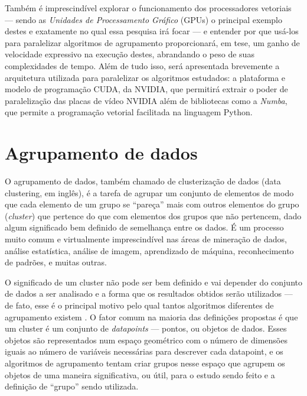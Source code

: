 \documentclass[12pt, %
openright, 
oneside, %
a4paper,    %
brazil]{facom-ufu-abntex2}
\begin{document}
Também é imprescindível explorar o funcionamento dos processadores vetoriais --- sendo as \textit{Unidades de Processamento Gráfico} (GPUs) o principal exemplo destes e exatamente no qual essa pesquisa irá focar --- e entender por que usá-los para paralelizar algoritmos de agrupamento proporcionará, em tese, um ganho de velocidade expressivo na execução destes, abrandando o peso de suas complexidades de tempo. Além de tudo isso, será apresentada brevemente a arquitetura utilizada para paralelizar os algoritmos estudados: a plataforma e modelo de programação CUDA, da NVIDIA, que permitirá extrair o poder de paralelização das placas de vídeo NVIDIA além de bibliotecas como a \textit{Numba}, que permite a programação vetorial facilitada na linguagem Python.





\section{Agrupamento de dados}

O agrupamento de dados, também chamado de clusterização de dados (data clustering, em inglês), é a tarefa de agrupar um conjunto de elementos de modo que cada elemento de um grupo se \enquote{pareça} mais com outros elementos do grupo (\textit{cluster}) que pertence do que com elementos dos grupos que não pertencem, dado algum significado bem definido de semelhança entre os dados. É um processo muito comum e virtualmente imprescindível nas áreas de mineração de dados, análise estatística, análise de imagem, aprendizado de máquina, reconhecimento de padrões, e muitas outras.

O significado de um cluster não pode ser bem definido e vai depender do conjunto de dados a ser analisado e a forma que os resultados obtidos serão utilizados --- de fato, esse é o principal motivo pelo qual tantos algoritmos diferentes de agrupamento existem \cite{SoManyClustAlg}. O fator comum na maioria das definições propostas é que um cluster é um conjunto de \textit{datapoints} --- pontos, ou objetos de dados. Esses objetos são representados num espaço geométrico com o número de dimensões iguais ao número de variáveis necessárias para descrever cada datapoint, e os algoritmos de agrupamento tentam criar grupos nesse espaço que agrupem os objetos de uma maneira significativa, ou útil, para o estudo sendo feito e a definição de \enquote{grupo} sendo utilizada.
\end{document}
